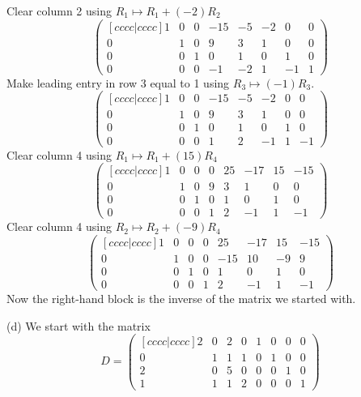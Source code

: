 \documentclass{article}
\begin{document}
Clear column 2 using \(R_1\mapsto
R_1+(-2)R_2\)\[\begin{pmatrix}[ c c c c | c c c c ] 1 & 0 & 0 & -15 &
-5 & -2 & 0 & 0 \\ 0 & 1 & 0 & 9 & 3 & 1 & 0 & 0 \\ 0 & 0 & 1 & 0 & 1
& 0 & 1 & 0 \\ 0 & 0 & 0 & -1 & -2 & 1 & -1 & 1 \end{pmatrix}\]Make
leading entry in row 3 equal to 1 using \(R_3\mapsto (-1)R_3\).
\[\begin{pmatrix}[ c c c c | c c c c ] 1 & 0 & 0 & -15 & -5 & -2 & 0 &
0 \\ 0 & 1 & 0 & 9 & 3 & 1 & 0 & 0 \\ 0 & 0 & 1 & 0 & 1 & 0 & 1 & 0
\\ 0 & 0 & 0 & 1 & 2 & -1 & 1 & -1 \end{pmatrix}\]Clear column 4 using
\(R_1\mapsto R_1+(15)R_4\)\[\begin{pmatrix}[ c c c c | c c c c ] 1 & 0
& 0 & 0 & 25 & -17 & 15 & -15 \\ 0 & 1 & 0 & 9 & 3 & 1 & 0 & 0 \\ 0 &
0 & 1 & 0 & 1 & 0 & 1 & 0 \\ 0 & 0 & 0 & 1 & 2 & -1 & 1 & -1
\end{pmatrix}\]Clear column 4 using \(R_2\mapsto
R_2+(-9)R_4\)\[\begin{pmatrix}[ c c c c | c c c c ] 1 & 0 & 0 & 0 & 25
& -17 & 15 & -15 \\ 0 & 1 & 0 & 0 & -15 & 10 & -9 & 9 \\ 0 & 0 & 1 & 0
& 1 & 0 & 1 & 0 \\ 0 & 0 & 0 & 1 & 2 & -1 & 1 & -1 \end{pmatrix}\]Now
the right-hand block is the inverse of the matrix we started with.


\newpage


(d) We start with the matrix \[D=\begin{pmatrix}[ c c c c | c c c c ]
2 & 0 & 2 & 0 & 1 & 0 & 0 & 0 \\ 0 & 1 & 1 & 1 & 0 & 1 & 0 & 0 \\ 2 &
0 & 5 & 0 & 0 & 0 & 1 & 0 \\ 1 & 1 & 1 & 2 & 0 & 0 & 0 & 1
\end{pmatrix}\]
\end{document}
